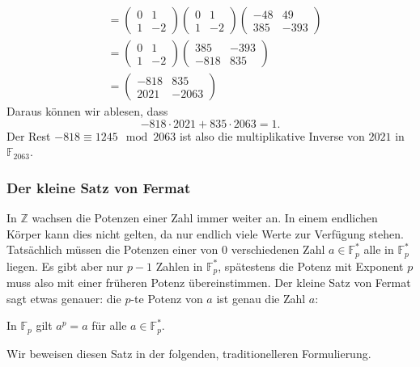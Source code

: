 \begin{beispiel}
\begin{align*}
\\
&=
\begin{pmatrix} 0& 1\\ 1& -2 \end{pmatrix}
\begin{pmatrix} 0& 1\\ 1& -2 \end{pmatrix}
\begin{pmatrix} -48& 49\\ 385& -393 \end{pmatrix}
\\
&=
\begin{pmatrix} 0& 1\\ 1& -2 \end{pmatrix}
\begin{pmatrix} 385& -393\\ -818& 835 \end{pmatrix}
\\
&=
\begin{pmatrix} -818&   835\\ 2021& -2063\end{pmatrix}
\end{align*}
Daraus können wir ablesen, dass
\[
-818\cdot 2021 +835 \cdot 2063=1.
\]
Der Rest $ -818\equiv 1245\mod 2063$ ist also die multiplikative
Inverse von $2021$ in $\mathbb{F}_{2063}$.
\end{beispiel}

\subsubsection{Der kleine Satz von Fermat}
In $\mathbb{Z}$ wachsen die Potenzen einer Zahl immer weiter an.
In einem endlichen Körper kann dies nicht gelten, da nur endlich
viele Werte zur Verfügung stehen.
Tatsächlich müssen die Potenzen einer von $0$ verschiedenen Zahl
$a\in\mathbb{F}_p^*$ alle in $\mathbb{F}_p^*$ liegen.
Es gibt aber nur $p-1$ Zahlen in $\mathbb{F}_p^*$, spätestens
die Potenz mit Exponent $p$ muss also mit einer früheren Potenz
übereinstimmen.
Der kleine Satz von Fermat sagt etwas genauer: die $p$-te Potenz
von $a$ ist genau die Zahl $a$:

\begin{satz}
\label{buch:endliche-koerper:satz:fermat}
In $\mathbb{F}_p$ gilt $a^p=a$ für alle $a\in\mathbb{F}_p^*$.
\end{satz}

Wir beweisen diesen Satz in der folgenden, traditionelleren 
Formulierung.


